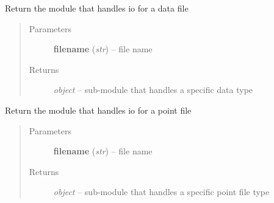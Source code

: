 \documentclass[letterpaper,10pt,english]{sphinxmanual}
\begin{document}

\begin{fulllineitems}
\label{api/ClearMap.IO:ClearMap.IO.IO.dataFileNameToModule}
Return the module that handles io for a data file
\begin{quote}\begin{description}
\item[{Parameters}] \leavevmode
\textbf{filename} (\emph{str}) --
file name

\item[{Returns}] \leavevmode
\emph{object} --
sub-module that handles a specific data type

\end{description}\end{quote}

\end{fulllineitems}


\begin{fulllineitems}
\label{api/ClearMap.IO:ClearMap.IO.IO.pointFileNameToModule}
Return the module that handles io for a point file
\begin{quote}\begin{description}
\item[{Parameters}] \leavevmode
\textbf{filename} (\emph{str}) --
file name

\item[{Returns}] \leavevmode
\emph{object} --
sub-module that handles a specific point file type

\end{description}\end{quote}

\end{fulllineitems}

\end{document}
